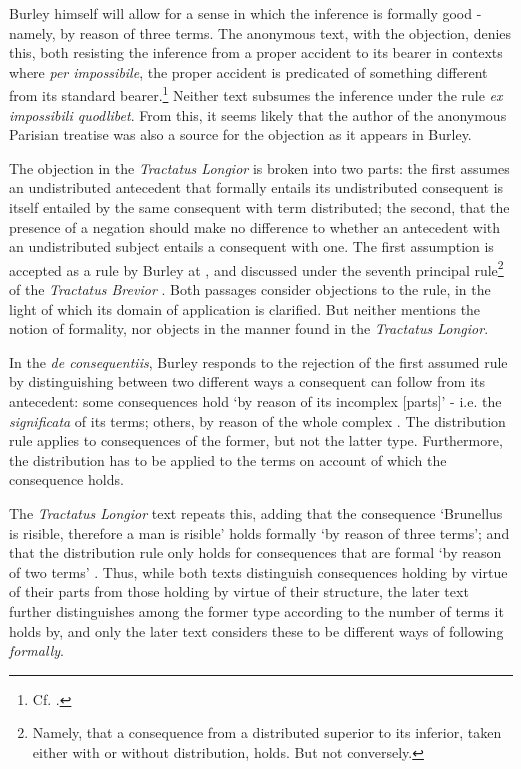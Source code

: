 \documentclass[]{birkjour}
\begin{document}
Burley himself will allow for a sense in which the inference is formally good - namely, by reason of three terms. The anonymous text, with the objection, denies this, both resisting the inference from a proper accident to its bearer in contexts where \textit{per impossibile}, the proper accident is predicated of something different from its standard bearer.\footnote{Cf. \autocite[q. 11, par. 19]{ScotusQE}.} Neither text subsumes the inference under the rule \textit{ex impossibili quodlibet}. From this, it seems likely that the author of the anonymous Parisian treatise was also a source for the objection as it appears in Burley.

The objection in the \textit{Tractatus Longior} is broken into two parts: the first assumes an undistributed antecedent that formally entails its undistributed consequent is itself entailed by the same consequent with term distributed; the second, that the presence of a negation should make no difference to whether an antecedent with an undistributed subject entails a consequent with one. The first assumption is accepted as a rule by Burley at \autocite[pp. 117-118, par. 26-31]{Green-Pedersen1980b}, and discussed under the seventh principal rule\footnote{Namely, that a consequence from a distributed superior to its inferior, taken either with or without distribution, holds. But not conversely.} of the \textit{Tractatus Brevior} \autocite[pp. 211.21-212.28]{BurleyDPAL}. Both passages consider objections to the rule, in the light of which its domain of application is clarified. But neither mentions the notion of formality, nor objects in the manner found in the \textit{Tractatus Longior}. 

In the \textit{de consequentiis}, Burley responds to the rejection of the first assumed rule by distinguishing between two different ways a consequent can follow from its antecedent: some consequences hold `by reason of its incomplex [parts]' - i.e. the \textit{significata} of its terms; others, by reason of the whole complex \autocite[p. 118, par. 31]{Green-Pedersen1980b}. The distribution rule applies to consequences of the former, but not the latter type. Furthermore, the distribution has to be applied to the terms on account of which the consequence holds. 

The \textit{Tractatus Longior} text repeats this, adding that the consequence `Brunellus is risible, therefore a man is risible' holds formally `by reason of three terms'; and that the distribution rule only holds for consequences that are formal `by reason of two terms' \autocite[pp. 84.11-85.17]{BurleyDPAL}. Thus, while both texts distinguish consequences holding by virtue of their parts from those holding by virtue of their structure, the later text further distinguishes among the former type according to the number of terms it holds by, and only the later text considers these to be different ways of following \textit{formally}.
\end{document}
